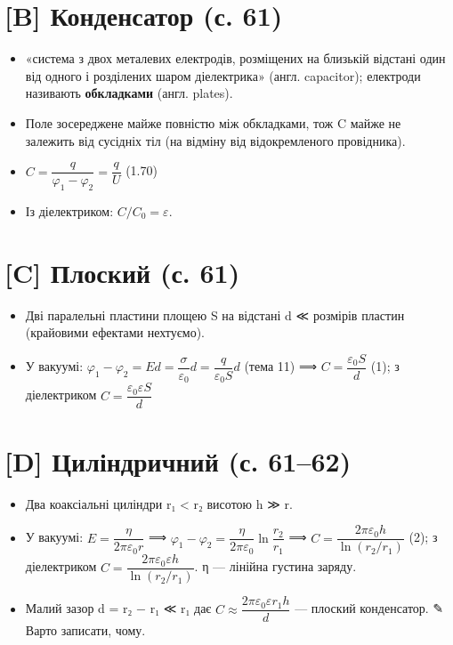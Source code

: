 \documentclass[11pt,a4paper,oneside]{book}
\newcommand{\pen}{{\sffamily\color{accent}✎}}
\begin{document}
\section*{[B] Конденсатор (с. 61)}
\begin{itemize}
\item «система з двох металевих електродів, розміщених на близькій відстані один від одного і розділених шаром діелектрика» (англ. capacitor); електроди називають \textbf{обкладками} (англ. plates).
\item Поле зосереджене майже повністю між обкладками, тож C майже не залежить від сусідніх тіл (на відміну від відокремленого провідника).
\item $C = \dfrac{q}{\varphi_1-\varphi_2} = \dfrac{q}{U}$ (1.70)
\item Із діелектриком: $C/C_0 = \varepsilon$.
\end{itemize}

\section*{[C] Плоский (с. 61)}
\begin{itemize}
\item Дві паралельні пластини площею S на відстані d ≪ розмірів пластин (крайовими ефектами нехтуємо).
\item У вакуумі: $\varphi_1-\varphi_2 = Ed = \dfrac{\sigma}{\varepsilon_0}d = \dfrac{q}{\varepsilon_0S}d$ (тема 11) ⟹ $C = \dfrac{\varepsilon_0S}{d}$ (1); з діелектриком $C = \dfrac{\varepsilon_0\varepsilon S}{d}$
\end{itemize}

\section*{[D] Циліндричний (с. 61–62)}
\begin{itemize}
\item Два коаксіальні циліндри r₁ < r₂ висотою h ≫ r.
\item У вакуумі: $E = \dfrac{\eta}{2\pi\varepsilon_0 r}$ ⟹ $\varphi_1-\varphi_2 = \dfrac{\eta}{2\pi\varepsilon_0}\ln\dfrac{r_2}{r_1}$ ⟹ $C = \dfrac{2\pi\varepsilon_0h}{\ln(r_2/r_1)}$ (2); з діелектриком $C = \dfrac{2\pi\varepsilon_0\varepsilon h}{\ln(r_2/r_1)}$. η — лінійна густина заряду.
\item Малий зазор d = r₂ − r₁ ≪ r₁ дає $C\approx\dfrac{2\pi\varepsilon_0\varepsilon r_1h}{d}$ — плоский конденсатор. \pen{} Варто записати, чому.
\end{itemize}
\end{document}
